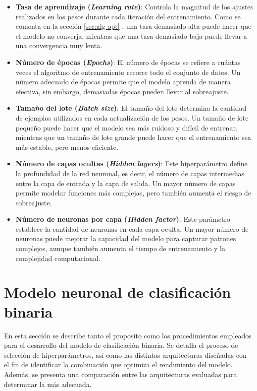 \begin{itemize}

    \item \textbf{Tasa de aprendizaje (\textit{Learning rate})}: Controla la magnitud de los ajustes realizados en los pesos durante cada iteración del entrenamiento. Como se comenta en la sección \ref{sec:alg-opt} , una tasa demasiado alta puede hacer que el modelo no converja, mientras que una tasa demasiado baja puede llevar a una convergencia muy lenta.
    
    \item \textbf{Número de épocas (\textit{Epochs})}: El número de épocas se refiere a cuántas veces el algoritmo de entrenamiento recorre todo el conjunto de datos. Un número adecuado de épocas permite que el modelo aprenda de manera efectiva, sin embargo, demasiadas épocas pueden llevar al sobreajuste.
    
    \item \textbf{Tamaño del lote (\textit{Batch size})}: El tamaño del lote determina la cantidad de ejemplos utilizados en cada actualización de los pesos. Un tamaño de lote pequeño puede hacer que el modelo sea más ruidoso y difícil de entrenar, mientras que un tamaño de lote grande puede hacer que el entrenamiento sea más estable, pero menos eficiente.
    
    \item \textbf{Número de capas ocultas (\textit{Hidden layers})}: Este hiperparámetro define la profundidad de la red neuronal, es decir, el número de capas intermedias entre la capa de entrada y la capa de salida. Un mayor número de capas permite modelar funciones más complejas, pero también aumenta el riesgo de sobreajuste.
    
    \item \textbf{Número de neuronas por capa (\textit{Hidden factor})}: Este parámetro establece la cantidad de neuronas en cada capa oculta. Un mayor número de neuronas puede mejorar la capacidad del modelo para capturar patrones complejos, aunque también aumenta el tiempo de entrenamiento y la complejidad computacional.
\end{itemize}



\section{Modelo neuronal de clasificación binaria} \label{sec.modBIN}
En esta sección se describe tanto el proposito como los procedimientos empleados para el desarrollo del modelo de clasificación binaria. Se detalla el proceso de selección de hiperparámetros, así como las distintas arquitecturas diseñadas con el fin de identificar la combinación que optimiza el rendimiento del modelo. Además, se presenta una comparación entre las arquitecturas evaluadas para determinar la más adecuada.

